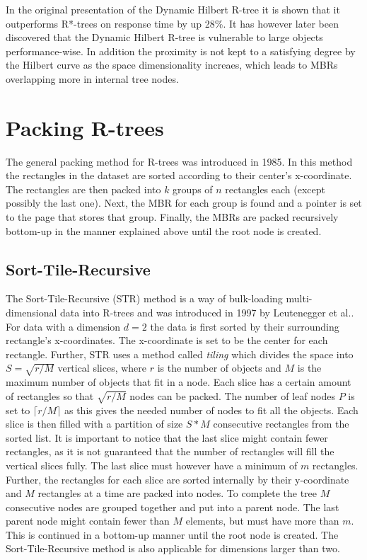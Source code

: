 In the original presentation of the Dynamic Hilbert R-tree it is shown that it outperforms R*-trees on response time by up 28\%\cite{HilbertRTree}. It has however later been discovered that the Dynamic Hilbert R-tree is vulnerable to large objects performance-wise. In addition the proximity is not kept to a satisfying degree by the Hilbert curve as the space dimensionality increaes, which leads to MBRs overlapping more in internal tree nodes\cite{RTreesTheoryApplications}.

\section{Packing R-trees}
The general packing method for R-trees was introduced in 1985\cite{DirectSpatialSearch}. In this method the rectangles in the dataset are sorted according to their center's x-coordinate. The rectangles are then packed into $k$ groups of $n$ rectangles each (except possibly the last one). Next, the MBR for each group is found and a pointer is set to the page that stores that group. Finally, the MBRs are packed recursively bottom-up in the manner explained above until the root node is created. 

\subsection{Sort-Tile-Recursive}
The Sort-Tile-Recursive (STR) method is a way of bulk-loading multi-dimensional data into R-trees and was introduced in 1997 by Leutenegger et al.\cite{STR}. For data with a dimension $d=2$ the data is first sorted by their surrounding rectangle's x-coordinates. The x-coordinate is set to be the center for each rectangle. Further, STR uses a method called \emph{tiling} which divides the space into $S = \sqrt{r/M}$ vertical slices, where $r$ is the number of objects and $M$ is the maximum number of objects that fit in a node. Each slice has a certain amount of rectangles so that $\sqrt{r/M}$ nodes can be packed. The number of leaf nodes $P$ is set to $\lceil{r/M}\rceil$ as this gives the needed number of nodes to fit all the objects. Each slice is then filled with a partition of size $S * M$ consecutive rectangles from the sorted list. It is important to notice that the last slice might contain fewer rectangles, as it is not guaranteed that the number of rectangles will fill the vertical slices fully. The last slice must however have a minimum of $m$ rectangles. Further, the rectangles for each slice are sorted internally by their y-coordinate and $M$ rectangles at a time are packed into nodes. To complete the tree $M$ consecutive nodes are grouped together and put into a parent node. The last parent node might contain fewer than $M$ elements, but must have more than $m$. This is continued in a bottom-up manner until the root node is created. The Sort-Tile-Recursive method is also applicable for dimensions larger than two. \newline

